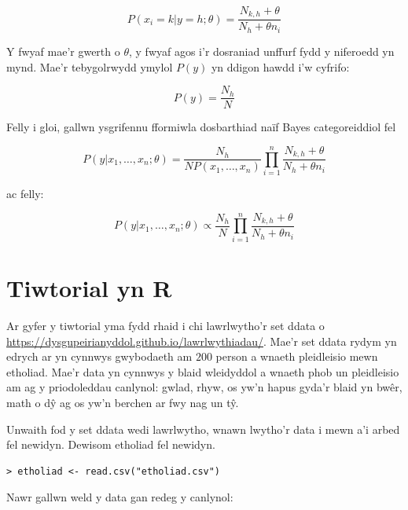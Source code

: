 \begin{equation}\label{eqn:llyfnhau-laplace}
P(x_{i} = k|y = h; \theta) = \frac{N_{k,h} + \theta}{N_{h} + \theta n_{i}}
\end{equation}

Y fwyaf mae'r gwerth o $\theta$, y fwyaf agos i'r dosraniad unffurf fydd y niferoedd yn mynd. Mae'r tebygolrwydd ymylol $P(y)$ yn ddigon hawdd i'w cyfrifo:

\begin{equation}\label{eqn:ymylol}
P(y) = \frac{N_{h}}{N}
\end{equation}

Felly i gloi, gallwn ysgrifennu fformiwla dosbarthiad na\"{i}f Bayes categoreiddiol fel

\begin{equation}\label{eqn:dosbarthiad-categoreiddiol}
P(y|x_{1}, \dots, x_{n}; \theta) = \frac{N_{h}}{N P(x_{1}, \dots, x_{n})} \prod^{n}_{i=1} \frac{N_{k,h} + \theta}{N_{h} + \theta n_{i}} 
\end{equation}

ac felly:

\begin{equation}\label{eqn:naif-bayes-syml}
P(y|x_{1}, \dots, x_{n}; \theta) \propto \frac{N_{h}}{N} \prod^{n}_{i=1} \frac{N_{k,h} + \theta}{N_{h} + \theta n_{i}}
\end{equation}

\section{Tiwtorial yn R}

Ar gyfer y tiwtorial yma fydd rhaid i chi lawrlwytho'r set ddata o \url{https://dysgupeirianyddol.github.io/lawrlwythiadau/}. Mae'r set ddata rydym yn edrych ar yn cynnwys gwybodaeth am $200$ person a wnaeth pleidleisio mewn etholiad. Mae'r data yn cynnwys y blaid wleidyddol a wnaeth phob un pleidleisio am ag y priodoleddau canlynol: gwlad, rhyw, os yw'n hapus gyda'r blaid yn bw\^{e}r, math o d\^{y} ag os yw'n berchen ar fwy nag un t\^{y}.

Unwaith fod y set ddata wedi lawrlwytho, wnawn lwytho'r data i mewn a'i arbed fel newidyn. Dewisom etholiad fel newidyn.

\begin{verbatim}
> etholiad <- read.csv("etholiad.csv")
\end{verbatim}

Nawr gallwn weld y data gan redeg y canlynol:

